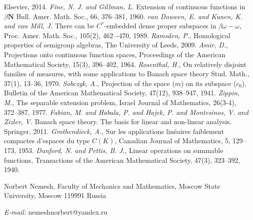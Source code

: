 \documentclass[12pt]{article}
\begin{document}
\begin{thebibliography}{999}
    Elsevier,
    2014.
    \textit{Fine, N. J. and Gillman, L.}
    Extension of continuous functions in $\beta {\mathbf{N}}$
    Bull. Amer. Math. Soc.,
    66,
    376--381,
    1960.
    \textit{van Douwen, E. and  Kunen,  K. and van Mill, J.}
    There can be $C^*$-embedded dense proper subspaces in $\beta\omega-\omega$,
    Proc. Amer. Math. Soc.,
    105(2),
    462–-470,
    1989.
    \textit{Ramsden, P.},
    Homological properties of semigroup algebras,
    The University of Leeds,
    2009.
    \textit{Amir, D.},
    Projections onto continuous function spaces,
    Proceedings of the American Mathematical Society,
    15(3),
    396--402,
    1964.
    \textit{Rosenthal, H.},
    On relatively disjoint families of measures, with some applications to Banach space theory
    Stud. Math.,
    37(1),
    13--36,
    1970.
    \textit{Sobczyk, A.},
    Projection of the space ($m$) on its subspace ($c_0$),
    Bulletin of the American Mathematical Society,
    47(12),
    938--947,
    1941.
    \textit{Zippin, M.},
    The separable extension problem,
    Israel Journal of Mathematics,
    26(3-4),
    372--387,
    1977.
    \textit{Fabian, M. and Habala, P. and Hajek, P. and Montesinos, V. and Zizler, V.}
    Banach space theory. The basis for linear and non-linear analysis.
    Springer,
    2011.
    \textit{{Grothendieck, A.}},
    Sur les applications lin{\'e}aires faiblement compactes d'espaces du type $C(K)$,
    Canadian Journal of Mathematics,
    5,
    129--173,
    1953.
    \textit{Dunford, N. and Pettis, B. J.},
    Linear operations on summable functions,
    Transactions of the American Mathematical Society,
    47(3),
    323--392,
    1940.
\end{thebibliography}

Norbert Nemesh, Faculty of Mechanics and Mathematics, Moscow State University, Moscow 119991 Russia

\textit{E-mail:} nemeshnorbert@yandex.ru
\end{document}
